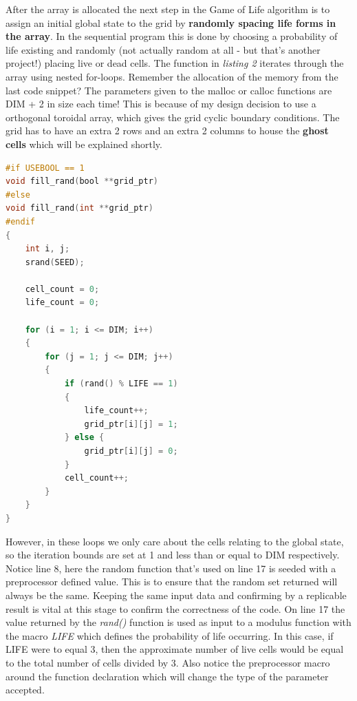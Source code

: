 \documentclass[11pt]{article} %
\begin{document}
\smallskip
After the array is allocated the next step in the Game of Life algorithm is to assign an initial global state to the grid by {\bf randomly spacing life forms in the array}. In the sequential program this is done by choosing a probability of life existing and randomly (not actually random at all - but that's another project!) placing live or dead cells. The function in {\it listing 2} iterates through the array using nested for-loops. Remember the allocation of the memory from the last code snippet? The parameters given to the malloc or calloc functions are DIM + 2 in size each time! This is because of my design decision to use a orthogonal toroidal array, which gives the grid cyclic boundary conditions. The grid has to have an extra 2 rows and an extra 2 columns to house the {\bf ghost cells} which will be explained shortly.
\begin{lstlisting}[language=C,caption={Randomly spacing lifeforms in the array}, morekeywords={malloc,calloc,bool}]
#if USEBOOL == 1
void fill_rand(bool **grid_ptr)
#else
void fill_rand(int **grid_ptr)
#endif
{
	int i, j;
	srand(SEED);

	cell_count = 0;
	life_count = 0;

	for (i = 1; i <= DIM; i++)
	{
		for (j = 1; j <= DIM; j++)
		{
			if (rand() % LIFE == 1)
			{
				life_count++;
				grid_ptr[i][j] = 1;
			} else {
				grid_ptr[i][j] = 0;
			}
			cell_count++;
		}
	}
}
\end{lstlisting}
However, in these loops we only care about the cells relating to the global state, so the iteration bounds are set at 1 and less than or equal to DIM respectively. Notice line 8, here the random function that's used on line 17 is seeded with a preprocessor defined value. This is to ensure that the random set returned will always be the same. Keeping the same input data and confirming by a replicable result is vital at this stage to confirm the correctness of the code. On line 17 the value returned by the {\it rand()} function is used as input to a modulus function with the macro {\it LIFE} which defines the probability of life occurring. In this case, if LIFE were to equal 3, then the approximate number of live cells would be equal to the total number of cells divided by 3. Also notice the preprocessor macro around the function declaration which will change the type of the parameter accepted.\\\\
\end{document}
